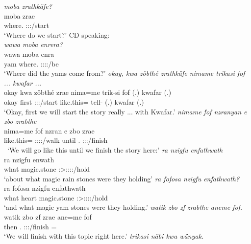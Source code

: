 \clearpage
\begin{exe}
	\emph{moba zrathkäfe?}\\
	\gll moba zrae\\ 
	where.{\Abl} \Fdu:\Sbj:\Irr:\Pfv/start\\
	\trans `Where do we start?'
	{\footnotesize{CD speaking:}}\\
	\emph{wawa moba enrera?}\\
	\gll wawa moba enra\\ 
	yam where.{\Abl} \Stpl:\Sbj:\Pst:\Ipfv:\Venit/be\\
	\trans `Where did the yams come from?'
	\emph{okay, kwa zöbthé zrathkäfe nimame trikasi fof ... kwafar ...}\\
	\gll okay kwa zöbthé zrae nima=me trik-si fof (.) kwafar (.)\\ 
	okay {\Fut} first \Fdu:\Sbj:\Irr:\Pfv/start like.this={\Ins} tell-{\Nmlz} {\Emph} (.) kwafar (.)\\
	\trans `Okay, first we will start the story really ... with Kwafar.'
	\emph{nimame fof nzranyan e zbo zrabthe}\\
	\gll nima=me fof nzran e zbo zrae\\ 
	like.this={\Ins} {\Emph} \Fdu:\Sbj:\Irr:\Ipfv:\Venit/walk until \Prox.{\All} \Fdu:\Sbj:\Irr:\Pfv/finish\\\
	\trans `We will go like this until we finish the story here:'
	\emph{ra nzigfu enfathwath}\\
	\gll ra nzigfu enwath\\ 
	what magic.stone \Stpl:\Sbj>\Stpl:\Obj:\Pst:\Ipfv:\Venit/hold\\
	\trans `about what magic rain stones were they holding'
	\emph{ra fofosa nzigfu enfathwath?}\\
	\gll ra fofosa nzigfu enfathwath\\ 
	what heart magic.stone \Stpl:\Sbj>\Stpl:\Obj:\Pst:\Ipfv:\Venit/hold\\
	\trans `and what magic yam stones were they holding.'
	\emph{watik zbo zf zrabthe aneme fof.}\\
	\gll watik zbo zf zrae ane=me fof\\ 
	then \Prox.{\All} {\Imm} \Fdu:\Sbj:\Irr:\Pfv/finish \Dem={\Ins} {\Emph}\\
	\trans `We will finish with this topic right here.'
	\emph{trikasi näbi kwa wänyak.}\\

\end{exe}
